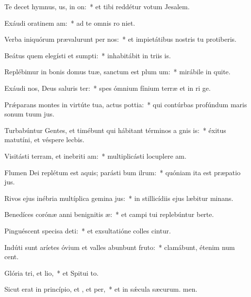 \item Te decet hymnus, us, in on:~* et tibi reddétur votum  Jesalem.
\item Exáudi oratinem am:~* ad te omnis ro niet.
\item Verba iniquórum prævalurunt per nos:~* et impietátibus nostris tu protiberis.
\item Beátus quem elegísti et sumpti:~* inhabitábit in triis is.
\item Replébimur in bonis domus tuæ, sanctum est plum um:~* mirábile in quite.
\item Exáudi nos, Deus saluris ter:~* spes ómnium fínium terræ et in ri ge.
\item Prǽparans montes in virtúte tua, actus pottia:~* qui contúrbas profúndum maris sonum tuum jus.
\item Turbabúntur Gentes, et timébunt qui hábitant términos a gnis is:~* éxitus matutíni, et véspere lecbis.
\item Visitásti terram, et inebriti am:~* multiplicásti locuplere am.
\item Flumen Dei replétum est aquis; parásti bum ilrum:~* quóniam ita est præpatio jus.
\item Rivos ejus inébria multíplica gemina jus:~* in stillicídiis ejus læbitur minans.
\item Benedíces corónæ anni benignitis æ:~* et campi tui replebúntur berte.
\item Pinguéscent specisa deti:~* et exsultatióne colles cintur.
\item Indúti sunt aríetes óvium et valles abunbunt fruto:~* clamábunt, étenim num cent.
\item Glória tri, et lio,~* et Spitui to.
\item Sicut erat in princípio, et , et per,~* et in sǽcula sæcurum. men.
